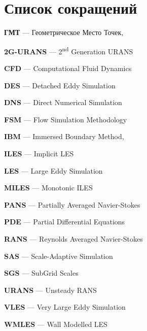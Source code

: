 \newpage

\section*{Список сокращений}

\textbf{ГМТ} --- Геометрическое Место Точек, \pageref{abbr:gmt}

\textbf{2G-URANS} --- 2\textsuperscript{nd} Generation URANS

\textbf{CFD} --- Computational Fluid Dynamics

\textbf{DES} --- Detached Eddy Simulation

\textbf{DNS} --- Direct Numerical Simulation

\textbf{FSM} --- Flow Simulation Methodology

\textbf{IBM} --- Immersed Boundary Method, \pageref{abbr:ibm}

\textbf{ILES} --- Implicit LES

\textbf{LES} --- Large Eddy Simulation

\textbf{MILES} --- Monotonic ILES

\textbf{PANS} --- Partially Averaged Navier-Stokes

\textbf{PDE} --- Partial Differential Equations

\textbf{RANS} --- Reynolds Averaged Navier-Stokes

\textbf{SAS} --- Scale-Adaptive Simulation

\textbf{SGS} --- SubGrid Scales

\textbf{URANS} --- Unsteady RANS

\textbf{VLES} --- Very Large Eddy Simulation

\textbf{WMLES} --- Wall Modelled LES